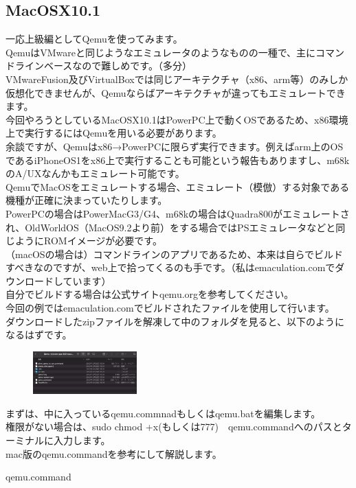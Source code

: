 \documentclass[b5paper,9pt,platex,dvipdfmx]{jsarticle}
\begin{document}
\begin{multicols*}{3}
\subsection{MacOSX10.1}
一応上級編としてQemuを使ってみます。\\
QemuはVMwareと同じようなエミュレータのようなものの一種で、主にコマンドラインベースなので難しめです。（多分）\\
VMwareFusion及びVirtualBoxでは同じアーキテクチャ（x86、arm等）のみしか仮想化できませんが、Qemuならばアーキテクチャが違ってもエミュレートできます。\\
今回やろうとしているMacOSX10.1はPowerPC上で動くOSであるため、x86環境上で実行するにはQemuを用いる必要があります。\\
余談ですが、Qemuはx86→PowerPCに限らず実行できます。例えばarm上のOSであるiPhoneOS1をx86上で実行することも可能という報告もありますし、m68kのA/UXなんかもエミュレート可能です。\\
QemuでMacOSをエミュレートする場合、エミュレート（模倣）する対象である機種が正確に決まっていたりします。\\
PowerPCの場合はPowerMacG3/G4、m68kの場合はQuadra800がエミュレートされ、OldWorldOS（MacOS9.2より前）をする場合ではPSエミュレータなどと同じようにROMイメージが必要です。\\
（macOSの場合は）コマンドラインのアプリであるため、本来は自らでビルドすべきなのですが、web上で拾ってくるのも手です。（私はemaculation.comでダウンロードしています）\\
自分でビルドする場合は公式サイトqemu.orgを参考してください。\\
今回の例ではemaculation.comでビルドされたファイルを使用して行います。\\
ダウンロードしたzipファイルを解凍して中のフォルダを見ると、以下のようになるはずです。\\
\begin{figure}[H]
  \centering
  \includegraphics[width=4cm]{2.png}
  \caption{}
\end{figure}
まずは、中に入っているqemu.commnadもしくはqemu.batを編集します。\\
権限がない場合は、sudo chmod +x(もしくは777)　qemu.commandへのパスとターミナルに入力します。\\
mac版のqemu.commandを参考にして解説します。\\
\begin{itembox}{qemu.command}


\end{itembox}
\end{multicols*}
\end{document}
